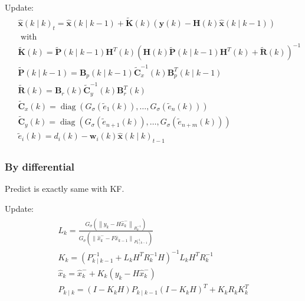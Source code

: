 \documentclass[dvipdfmx]{jsarticle}
\begin{document}
Update:
\begin{equation}\nonumber\label{Func.}\begin{aligned}
  \begin{aligned}
    &\widehat{\mathbf{x}}(k \mid k)_{t}=\widehat{\mathbf{x}}(k \mid k-1)+\widetilde{\mathbf{K}}(k)(\mathbf{y}(k)-\mathbf{H}(k) \widehat{\mathbf{x}}(k \mid k-1))\\
    &\text { with }\\
    &\tilde{\mathbf{K}}(k)=\tilde{\mathbf{P}}(k \mid k-1) \mathbf{H}^{T}(k)\left(\mathbf{H}(k) \tilde{\mathbf{P}}(k \mid k-1) \mathbf{H}^{T}(k)+\widetilde{\mathbf{R}}(k)\right)^{-1}\\
    &\widetilde{\mathbf{P}}(k \mid k-1)=\mathbf{B}_{p}(k \mid k-1) \tilde{\mathbf{C}}_{x}^{-1}(k) \mathbf{B}_{p}^{T}(k \mid k-1)\\
    &\widetilde{\mathbf{R}}(k)=\mathbf{B}_{r}(k) \widetilde{\mathbf{C}}_{y}^{-1}(k) \mathbf{B}_{r}^{T}(k)\\
    &\widetilde{\mathbf{C}}_{x}(k)=\operatorname{diag}\left(G_{\sigma}\left(\tilde{e}_{1}(k)\right), \ldots, G_{\sigma}\left(\widetilde{e}_{n}(k)\right)\right)\\
    &\widetilde{\mathbf{C}}_{y}(k)=\operatorname{diag}\left(G_{\sigma}\left(\widetilde{e}_{n+1}(k)\right), \ldots, G_{\sigma}\left(\widetilde{e}_{n+m}(k)\right)\right)\\
    &\widetilde{e}_{i}(k)=d_{i}(k)-\mathbf{w}_{i}(k) \widehat{\mathbf{x}}(k \mid k)_{t-1}
    \end{aligned}
\end{aligned}\end{equation}
\subsubsection*{By differential}
Predict is exactly same with KF.

Update:
\begin{equation}\nonumber\label{Func.}\begin{aligned}
  \begin{array}{c}
    L_{k}=\frac{G_{\sigma}\left(\left\|y_{k}-H \hat{x}_{k}^{-}\right\|_{R_{k}^{-1}}\right)}{G_{\sigma}\left(\left\|\hat{x}_{k}^{-}-F \hat{x}_{k-1}\right\|_{P_{k \mid k-1}^{-1}}\right)} \\
    K_{k}=\left(P_{k \mid k-1}^{-1}+L_{k} H^{T} R_{k}^{-1} H\right)^{-1} L_{k} H^{T} R_{k}^{-1} \\
    \hat{x}_{k}=\hat{x}_{k}^{-}+K_{k}\left(y_{k}-H \hat{x}_{k}^{-}\right) \\
    P_{k \mid k}=\left(I-K_{k} H\right) P_{k \mid k-1}\left(I-K_{k} H\right)^{T}+K_{k} R_{k} K_{k}^{T}
    \end{array}
\end{aligned}\end{equation}
\end{document}
